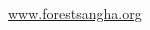 
\vspace*{-3\onelineskip}

{\centering

{\soChapter{\MakeUppercase{\branchMonasteries}}}

\westernDisciplesOfAjahnChah

\portalPageWorldWide\\
\href{http://www.forestsangha.org}{\textcolor{darkgold}{www.forestsangha.org}}
\vspace*{\baselineskip}

\hspace*{10mm}
\begin{minipage}{0.8\linewidth}
\begin{multicols}{2}
\setlength{\parindent}{0pt}
\setlength{\parskip}{0.8\baselineskip}
\addressesSize



\end{multicols}
\end{minipage}

}
